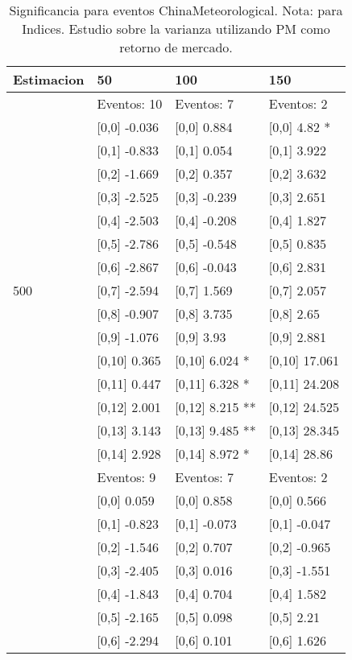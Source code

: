 \begin{table}

\caption{Significancia para eventos ChinaMeteorological. Nota: para Indices. Estudio sobre la varianza utilizando PM como retorno de mercado.}
\centering
\begin{tabular}[t]{llll}
\toprule
Estimacion & 50 & 100 & 150\\
\midrule
 & Eventos:  10 & Eventos:  7 & Eventos:  2\\
 & {}[0,0] -0.036 & {}[0,0] 0.884 & {}[0,0] 4.82 *\\
 & {}[0,1] -0.833 & {}[0,1] 0.054 & {}[0,1] 3.922\\
 & {}[0,2] -1.669 & {}[0,2] 0.357 & {}[0,2] 3.632\\
 & {}[0,3] -2.525 & {}[0,3] -0.239 & {}[0,3] 2.651\\
\addlinespace
 & {}[0,4] -2.503 & {}[0,4] -0.208 & {}[0,4] 1.827\\
 & {}[0,5] -2.786 & {}[0,5] -0.548 & {}[0,5] 0.835\\
 & {}[0,6] -2.867 & {}[0,6] -0.043 & {}[0,6] 2.831\\
500 & {}[0,7] -2.594 & {}[0,7] 1.569 & {}[0,7] 2.057\\
 & {}[0,8] -0.907 & {}[0,8] 3.735 & {}[0,8] 2.65\\
\addlinespace
 & {}[0,9] -1.076 & {}[0,9] 3.93 & {}[0,9] 2.881\\
 & {}[0,10] 0.365 & {}[0,10] 6.024 * & {}[0,10] 17.061\\
 & {}[0,11] 0.447 & {}[0,11] 6.328 * & {}[0,11] 24.208\\
 & {}[0,12] 2.001 & {}[0,12] 8.215 ** & {}[0,12] 24.525\\
 & {}[0,13] 3.143 & {}[0,13] 9.485 ** & {}[0,13] 28.345\\
\addlinespace
 & {}[0,14] 2.928 & {}[0,14] 8.972 * & {}[0,14] 28.86\\
 & Eventos:  9 & Eventos:  7 & Eventos:  2\\
 & {}[0,0] 0.059 & {}[0,0] 0.858 & {}[0,0] 0.566\\
 & {}[0,1] -0.823 & {}[0,1] -0.073 & {}[0,1] -0.047\\
 & {}[0,2] -1.546 & {}[0,2] 0.707 & {}[0,2] -0.965\\
\addlinespace
 & {}[0,3] -2.405 & {}[0,3] 0.016 & {}[0,3] -1.551\\
 & {}[0,4] -1.843 & {}[0,4] 0.704 & {}[0,4] 1.582\\
 & {}[0,5] -2.165 & {}[0,5] 0.098 & {}[0,5] 2.21\\
 & {}[0,6] -2.294 & {}[0,6] 0.101 & {}[0,6] 1.626\\

\end{tabular}
\end{table}
